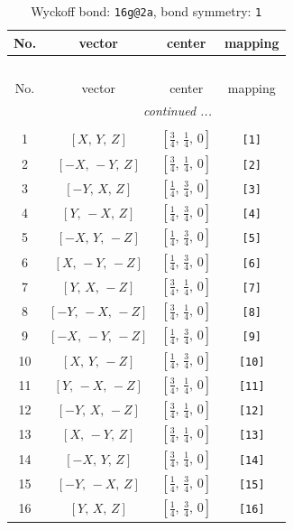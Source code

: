 \documentclass[fleqn,8pt]{jsarticle}
\begin{document}
\begin{longtable}{cccc}
\caption{Wyckoff bond: {\tt 16g@2a}, bond symmetry: {\tt 1}}
 \\
 \hline \hline
No. & vector & center & mapping \\ \hline \endfirsthead

\multicolumn{3}{l}{\tablename\ \thetable{}} \\
 \hline \hline
No. & vector & center & mapping \\ \hline \endhead

 \hline \hline
\multicolumn{3}{r}{\footnotesize\it continued ...} \\ \endfoot

 \hline \hline
\multicolumn{3}{r}{} \\ \endlastfoot

1 & $\left[ X,\, Y,\, Z \right]$ & $\left[ \frac{3}{4},\, \frac{1}{4},\, 0 \right]$ & {\tt [1]} \\ \hline
2 & $\left[ - X,\, - Y,\, Z \right]$ & $\left[ \frac{3}{4},\, \frac{1}{4},\, 0 \right]$ & {\tt [2]} \\ \hline
3 & $\left[ - Y,\, X,\, Z \right]$ & $\left[ \frac{1}{4},\, \frac{3}{4},\, 0 \right]$ & {\tt [3]} \\ \hline
4 & $\left[ Y,\, - X,\, Z \right]$ & $\left[ \frac{1}{4},\, \frac{3}{4},\, 0 \right]$ & {\tt [4]} \\ \hline
5 & $\left[ - X,\, Y,\, - Z \right]$ & $\left[ \frac{1}{4},\, \frac{3}{4},\, 0 \right]$ & {\tt [5]} \\ \hline
6 & $\left[ X,\, - Y,\, - Z \right]$ & $\left[ \frac{1}{4},\, \frac{3}{4},\, 0 \right]$ & {\tt [6]} \\ \hline
7 & $\left[ Y,\, X,\, - Z \right]$ & $\left[ \frac{3}{4},\, \frac{1}{4},\, 0 \right]$ & {\tt [7]} \\ \hline
8 & $\left[ - Y,\, - X,\, - Z \right]$ & $\left[ \frac{3}{4},\, \frac{1}{4},\, 0 \right]$ & {\tt [8]} \\ \hline
9 & $\left[ - X,\, - Y,\, - Z \right]$ & $\left[ \frac{1}{4},\, \frac{3}{4},\, 0 \right]$ & {\tt [9]} \\ \hline
10 & $\left[ X,\, Y,\, - Z \right]$ & $\left[ \frac{1}{4},\, \frac{3}{4},\, 0 \right]$ & {\tt [10]} \\ \hline
11 & $\left[ Y,\, - X,\, - Z \right]$ & $\left[ \frac{3}{4},\, \frac{1}{4},\, 0 \right]$ & {\tt [11]} \\ \hline
12 & $\left[ - Y,\, X,\, - Z \right]$ & $\left[ \frac{3}{4},\, \frac{1}{4},\, 0 \right]$ & {\tt [12]} \\ \hline
13 & $\left[ X,\, - Y,\, Z \right]$ & $\left[ \frac{3}{4},\, \frac{1}{4},\, 0 \right]$ & {\tt [13]} \\ \hline
14 & $\left[ - X,\, Y,\, Z \right]$ & $\left[ \frac{3}{4},\, \frac{1}{4},\, 0 \right]$ & {\tt [14]} \\ \hline
15 & $\left[ - Y,\, - X,\, Z \right]$ & $\left[ \frac{1}{4},\, \frac{3}{4},\, 0 \right]$ & {\tt [15]} \\ \hline
16 & $\left[ Y,\, X,\, Z \right]$ & $\left[ \frac{1}{4},\, \frac{3}{4},\, 0 \right]$ & {\tt [16]} \\
\end{longtable}
\end{document}
